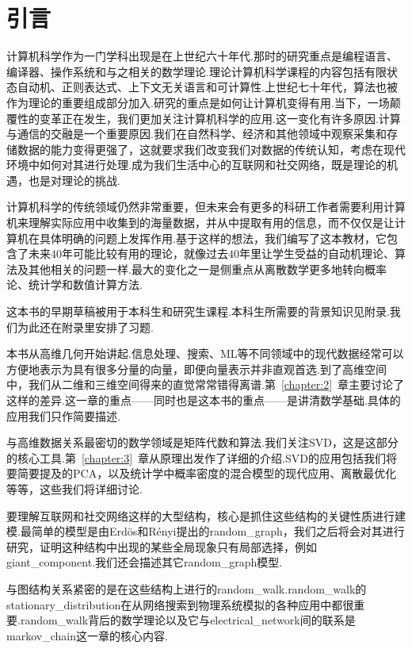 \chapter{引言}
计算机科学作为一门学科出现是在上世纪六十年代.那时的研究重点是编程语言、编译器、操作系统和与之相关的数学理论.理论计算机科学课程的内容包括有限状态自动机、正则表达式、上下文无关语言和可计算性.上世纪七十年代，算法也被作为理论的重要组成部分加入.研究的重点是如何让计算机变得有用.当下，一场颠覆性的变革正在发生，我们更加关注计算机科学的应用.这一变化有许多原因.计算与通信的交融是一个重要原因.我们在自然科学、经济和其他领域中观察采集和存储数据的能力变得更强了，这就要求我们改变我们对数据的传统认知，考虑在现代环境中如何对其进行处理.成为我们生活中心的互联网和社交网络，既是理论的机遇，也是对理论的挑战.

计算机科学的传统领域仍然非常重要，但未来会有更多的科研工作者需要利用计算机来理解实际应用中收集到的海量数据，并从中提取有用的信息，而不仅仅是让计算机在具体明确的问题上发挥作用.基于这样的想法，我们编写了这本教材，它包含了未来$40$年可能比较有用的理论，就像过去$40$年里让学生受益的自动机理论、算法及其他相关的问题一样.最大的变化之一是侧重点从离散数学更多地转向概率论、统计学和数值计算方法.

这本书的早期草稿被用于本科生和研究生课程.本科生所需要的背景知识见附录.我们为此还在附录里安排了习题.

本书从高维几何开始讲起.信息处理、搜索、\gls{ML}等不同领域中的现代数据经常可以方便地表示为具有很多分量的向量，即便向量表示并非直观首选.到了高维空间中，我们从二维和三维空间得来的直觉常常错得离谱.第~\ref{chapter:2}~章主要讨论了这样的差异.这一章的重点——同时也是这本书的重点——是讲清数学基础.具体的应用我们只作简要描述.

与高维数据关系最密切的数学领域是矩阵代数和算法.我们关注\gls{SVD}，这是这部分的核心工具.第~\ref{chapter:3}~章从原理出发作了详细的介绍.\gls{SVD}的应用包括我们将要简要提及的\gls{PCA}，以及统计学中概率密度的混合模型的现代应用、离散最优化等等，这些我们将详细讨论.

要理解互联网和社交网络这样的大型结构，核心是抓住这些结构的关键性质进行建模.最简单的模型是由Erd\"os和R\'enyi提出的\gls{random_graph}，我们之后将会对其进行研究，证明这种结构中出现的某些全局现象只有局部选择，例如\gls{giant_component}.我们还会描述其它\gls{random_graph}模型.

与图结构关系紧密的是在这些结构上进行的\gls{random_walk}.\gls{random_walk}的\gls{stationary_distribution}在从网络搜索到物理系统模拟的各种应用中都很重要.\gls{random_walk}背后的数学理论以及它与\gls{electrical_network}间的联系是\gls{markov_chain}这一章的核心内容.

